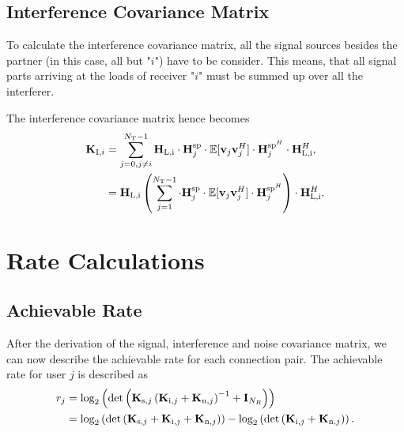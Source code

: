 \subsection{Interference Covariance Matrix}
\label{sec:int_cov}

To calculate the interference covariance matrix, all the signal sources besides the partner (in this case, all but "$i$") have to be consider.
This means, that all signal parts arriving at the loads of receiver "$i$" must be summed up over all the interferer.

The interference covariance matrix hence becomes 
\begin{align}
\label{eq:interf_cov}\nonumber
\mat{K}_{\text{I},i}%
 	&= \sum_{j=0,j\neq i}^{N_\text{T}-1} 
	\mat{H}_\text{L,i} \cdot \mat{H}_{j}^{\text{sp}} \cdot 
	\mathbb{E}[\vec{v}_{j}\vec{v}_{j}^H] \cdot 
	\mat{H}_{j}^{\text{sp}^H} \cdot \mat{H}_\text{L,i}^H,\\
	&= \mat{H}_\text{L,i} \left(\sum_{j=1}^{N_\text{T}-1} 
	\cdot \mat{H}_{j}^{\text{sp}} \cdot 
	\mathbb{E}[\vec{v}_{j}\vec{v}_{j}^H] \cdot 
	\mat{H}_{j}^{\text{sp}^H}\right) \cdot \mat{H}_\text{L,i}^H.
\end{align}





\section{Rate Calculations}
\label{sec:rates}

\subsection{Achievable Rate}
\label{sec:achiev_rate}
After the derivation of the signal, interference and noise covariance matrix, we can now describe the achievable rate for each connection pair.
The achievable rate for user $j$ is described as
\begin{align}
\label{eq:achiev_rate}
\nonumber
r_j &= \text{log}_2\left(\text{det}\left(\mathbf{K}_{\text{s},j}\left(\mathbf{K}_{\text{i},j}+\mathbf{K}_{\text{n},j}\right)^{-1}+\mathbf{I}_{N_R}\right)\right)\\
 &=\text{log}_2\left(
	\text{det}\left(\mathbf{K}_{\text{s},j}+
		\mathbf{K}_{\text{i},j}+\mathbf{K}_{\text{n},j}\right)\right) -
	\text{log}_2\left(\text{det}\left(\mathbf{K}_{\text{i},j}+\mathbf{K}_{\text{n},j}\right)\right).
\end{align}


